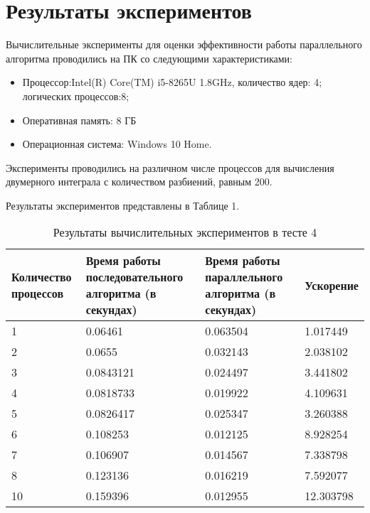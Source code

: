 \documentclass{report}
\begin{document}
\section*{Результаты экспериментов}
Вычислительные эксперименты для оценки эффективности работы параллельного алгоритма проводились на ПК со следующими характеристиками:
\begin{itemize}
\item Процессор:Intel(R) Core(TM) i5-8265U 1.8GHz, количество ядер: 4; логических процессов:8;
\item Оперативная память: 8 ГБ
\item Операционная система: Windows 10 Home.
\end{itemize}

\par Эксперименты проводились на различном числе процессов для вычисления двумерного  интеграла  с количеством разбиений, равным 200. 
\par Результаты экспериментов представлены в Таблице 1.

\begin{table}[!h]
\caption{Результаты вычислительных экспериментов в тесте 4}
\centering
\begin{tabular}{| p{2cm} | p{3cm} | p{4cm} | p{2cm} |}
\hline
Количество процессов & Время работы последовательного алгоритма (в секундах) & Время работы параллельного алгоритма (в секундах) & Ускорение  \\[5pt]
\hline
1        & 0.06461        & 0.063504    &1.017449       \\
2        & 0.0655      &0.032143   &  2.038102     \\
3        &  0.0843121      & 0.024497      &3.441802 \\
4        &  0.0818733       &  0.019922     & 4.109631     \\
5        &  0.0826417      & 0.025347   &   3.260388     \\
6        &  0.108253      &   0.012125   &    8.928254    \\
7        &    0.106907      & 0.014567      &  7.338798     \\
8        &   0.123136       &   0.016219  &   7.592077   \\
10       &    0.159396       &   0.012955  &   12.303798   \\
\hline
\end{tabular}
\end{table}
\end{document}
